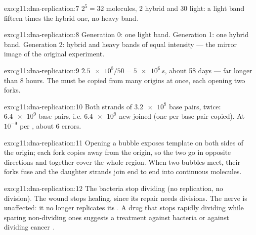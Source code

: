 \begin{solution}{exo:g11:dna-replication:7}
$2^5 = 32$ molecules, 2 hybrid and 30 light: a light band fifteen
times the hybrid one, no heavy band.
\end{solution}

\begin{solution}{exo:g11:dna-replication:8}
Generation 0: one light band. Generation 1: one hybrid band.
Generation 2: hybrid and heavy bands of equal intensity --- the mirror
image of the original experiment.
\end{solution}

\begin{solution}{exo:g11:dna-replication:9}
$\num{2.5e8}/50 = \num{5e6}\,\unit{s}$, about 58 days --- far longer
than 8 hours. The  must be copied from many origins at once,
each opening two forks.
\end{solution}

\begin{solution}{exo:g11:dna-replication:10}
Both strands of $\num{3.2e9}$ base pairs, twice: $\num{6.4e9}$ base
pairs, i.e. $\num{6.4e9}$ new  joined (one per base pair
copied). At $10^{-9}$ per , about 6 errors.
\end{solution}

\begin{solution}{exo:g11:dna-replication:11}
Opening a bubble exposes template on both sides of the origin; each
fork copies away from the origin, so the two go in opposite directions
and together cover the whole region. When two bubbles meet, their
forks fuse and the daughter strands join end to end into continuous
molecules.
\end{solution}

\begin{solution}{exo:g11:dna-replication:12}
The bacteria stop dividing (no replication, no division). The wound
stops healing, since its repair needs  divisions. The nerve 
is unaffected: it no longer replicates its . A drug that stops
rapidly dividing  while sparing non-dividing ones suggests a
treatment against bacteria or against dividing cancer .
\end{solution}


